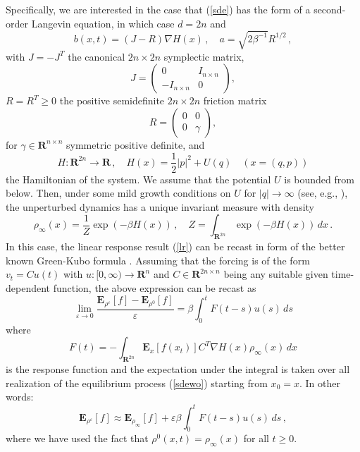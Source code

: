 \documentclass[]{tMPH2e}
\newcommand{\R}{{\mathbf R}}
\newcommand{\eps}{\varepsilon}
\newcommand{\bE}{{\mathbf E}}
\begin{document}
Specifically, we are interested in the case that (\ref{sde}) has the form of a second-order Langevin equation, in which case $d=2n$ and 
\begin{equation}\label{eqn:langevin-1}
b(x,t) = (J-R)\nabla H(x)\,,\quad a = \sqrt{2\beta^{-1}}R^{1/2}\,,
\end{equation}
with $J=-J^{T}$ the canonical $2n\times 2n$ symplectic matrix,
\[
J = \left ( \begin{array}{cc} 
0 & I_{n\times n} \\ -I_{n\times n} &0
\end{array}\right),
\]
$R=R^{T}\ge 0$ the positive semidefinite $2n\times 2n$ friction matrix 
\[
R = \left ( \begin{array}{cc}
0 & 0 \\ 0 & \gamma
\end{array}\right),
\]
for $\gamma\in\R^{n\times n}$ symmetric positive definite, and 
\[
H\colon\R^{2n}\to\R\,,\quad H(x) = \frac{1}{2}|p|^{2} + U(q) \quad (x=(q,p))
\] 
the Hamiltonian of the system. We assume that the potential $U$ is bounded from below. Then, under some mild growth conditions on $U$ for $|q|\to\infty$ (see, e.g., \cite{mattingly2002}), the unperturbed dynamics has a unique invariant measure with density 
\[
\rho_{\infty}(x) = \frac{1}{Z}\exp(-\beta H(x))\,,\quad  Z=\int_{\R^{2n}}  \exp(-\beta H(x))\,dx\,.
\] 
In this case, the linear response result (\ref{lr}) can be recast in form of the better known Green-Kubo formula \cite{risken1996}. Assuming that the forcing is of the form $v_{t}=Cu(t)$ with $u\colon[0,\infty)\to\R^{n}$ and $C\in\R^{2n\times n}$ being any suitable given time-dependent function, the above expression can be recast as 
\begin{equation}\label{GreenKubo}
\lim_{\eps\to 0}\frac{\bE_{\rho^{\eps}}[f] - \bE_{\rho^{0}}[f]}{\eps} = \beta\int_{0}^{t}F(t-s)u(s)\,ds
\end{equation}
where 
\[
F(t) = - \int_{\R^{2n}}\bE_{x}[f(x_{t})] C^{T}\nabla H(x)\rho_{\infty}(x)\,dx
\]
is the response function and the expectation under the integral is taken over all realization of the equilibrium process (\ref{sdewo}) starting from $x_{0}=x$. In other words: 
\[
\bE_{\rho^{\eps}}[f] \approx \bE_{\rho_{\infty}}[f] + \eps\beta\int_{0}^{t}F(t-s)u(s)\,ds\,,
\]
where we have used the fact that $\rho^{0}(x,t)= \rho_{\infty}(x)$ for all $t\ge 0$. 
 
\end{document}
